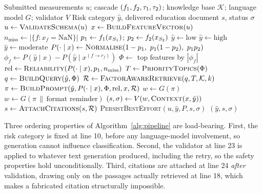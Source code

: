 \begin{algorithm}[H]
\caption{End-to-end kidney-risk screening and education}
\label{alg:pipeline}
\begin{algorithmic}[1]
\Require Submitted measurements $u$; cascade $(f_1, f_2, \tau_{1}, \tau_{2})$;
knowledge base $\mathcal{K}$; language model $G$; validator $V$
\Ensure Risk category $\hat{y}$, delivered education document $s$, status $\sigma$
\State $u \gets \textsc{ValidateSchema}(u)$ 
\State $x \gets \textsc{BuildFeatureVector}(u)$ 
\State $n_{\mathrm{miss}} \gets |\{f : x_f = \text{NaN}\}|$
\State $p_{1} \gets f_1(x_{S_1})$; \quad $p_{2} \gets f_2(x_{S_2})$
\If{$\pone < \tauone$} \State $\hat{y} \gets \text{low}$
\ElsIf{$\ptwo \geq \tautwo$} \State $\hat{y} \gets \text{high}$
\Else \State $\hat{y} \gets \text{moderate}$
\EndIf
\State $P(\cdot \mid x) \gets \textsc{Normalise}(1-p_{1},\ p_{1}(1-p_{2}),\ p_{1} p_{2})$
  \State $\phi_f \gets P(\hat{y} \mid x) - P(\hat{y} \mid x^{(f \rightarrow r_f)})$
\EndFor
\State $\Phi \gets$ top features by $|\phi_f|$
\State $\mathrm{rel} \gets \textsc{Reliability}(P(\cdot\mid x), p_{1}, n_{\mathrm{miss}})$
\State $T \gets \textsc{PriorityTopics}(\Phi)$ 
\State $q \gets \textsc{BuildQuery}(\hat{y}, \Phi)$
\State $\mathcal{R} \gets \textsc{FactorAwareRetrieve}(q, T, \mathcal{K}, k)$
\State $\pi \gets \textsc{BuildPrompt}(\hat{y}, P(\cdot\mid x), \Phi, \mathrm{rel}, x, \mathcal{R})$
\State $w \gets G(\pi)$
  \State $w \gets G(\pi \,\|\, \text{format reminder})$ 
\EndIf
\State $(s, \sigma) \gets V(w, \textsc{Context}(x, \hat{y}))$
\State $s \gets \textsc{AttachCitations}(s, \mathcal{R})$
\State \textsc{PersistBestEffort}$(u, \hat{y}, P, s, \sigma)$
\State \Return $(\hat{y}, s, \sigma)$
\end{algorithmic}
\end{algorithm}

Three ordering properties of Algorithm~\ref{alg:pipeline} are load-bearing.
First, the risk category is fixed at line 10, before any language-model
involvement, so generation cannot influence classification. Second, the
validator at line 23 is applied to whatever text generation produced, including
the retry, so the safety properties hold unconditionally. Third, citations are
attached at line 24 \emph{after} validation, drawing only on the passages
actually retrieved at line 18, which makes a fabricated citation structurally
impossible.

